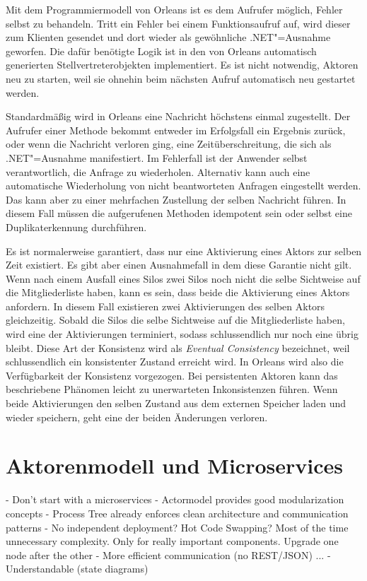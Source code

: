 Mit dem Programmiermodell von Orleans ist es dem Aufrufer möglich, Fehler selbst zu behandeln. Tritt ein Fehler bei einem Funktionsaufruf auf, wird dieser zum Klienten gesendet und dort wieder als gewöhnliche .NET"=Ausnahme geworfen. Die dafür benötigte Logik ist in den von Orleans automatisch generierten Stellvertreterobjekten implementiert. Es ist nicht notwendig, Aktoren neu zu starten, weil sie ohnehin beim nächsten Aufruf automatisch neu gestartet werden.

Standardmäßig wird in Orleans eine Nachricht höchstens einmal zugestellt. Der Aufrufer einer Methode bekommt entweder im Erfolgsfall ein Ergebnis zurück, oder wenn die Nachricht verloren ging, eine Zeitüberschreitung, die sich als .NET"=Ausnahme manifestiert. Im Fehlerfall ist der Anwender selbst verantwortlich, die Anfrage zu wiederholen. Alternativ kann auch eine automatische Wiederholung von nicht beantworteten Anfragen eingestellt werden. Das kann aber zu einer mehrfachen Zustellung der selben Nachricht führen. In diesem Fall müssen die aufgerufenen Methoden idempotent sein oder selbst eine Duplikaterkennung durchführen.

Es ist normalerweise garantiert, dass nur eine Aktivierung eines Aktors zur selben Zeit existiert. Es gibt aber einen Ausnahmefall in dem diese Garantie nicht gilt. Wenn nach einem Ausfall eines Silos zwei Silos noch nicht die selbe Sichtweise auf die Mitgliederliste haben, kann es sein, dass beide die Aktivierung eines Aktors anfordern. In diesem Fall existieren zwei Aktivierungen des selben Aktors gleichzeitig. Sobald die Silos die selbe Sichtweise auf die Mitgliederliste haben, wird eine der Aktivierungen terminiert, sodass schlussendlich nur noch eine übrig bleibt. Diese Art der Konsistenz wird als \textit{Eventual Consistency} bezeichnet, weil schlussendlich ein konsistenter Zustand erreicht wird. In Orleans wird also die Verfügbarkeit der Konsistenz vorgezogen. Bei persistenten Aktoren kann das beschriebene Phänomen leicht zu unerwarteten Inkonsistenzen führen. Wenn beide Aktivierungen den selben Zustand aus dem externen Speicher laden und wieder speichern, geht eine der beiden Änderungen verloren.

\pagebreak

\section{Aktorenmodell und Microservices}

- Don't start with a microservices
- Actormodel provides good modularization concepts
- Process Tree already enforces clean architecture and communication patterns
- No independent deployment? Hot Code Swapping? Most of the time unnecessary complexity. Only for really important components. Upgrade one node after the other
- More efficient communication (no REST/JSON) ...
- Understandable (state diagrams)

\iffalse

- Conclusion
  - Different Names: Actors, Processes, Grains ... same principles
	- Different Programming models: function vs oo

\fi